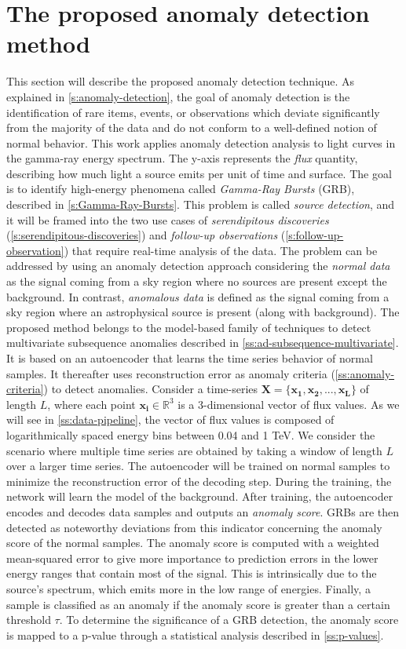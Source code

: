 \section{The proposed anomaly detection method}
\label{s:contribution}
This section will describe the proposed anomaly detection technique. As explained in \autoref{s:anomaly-detection}, the goal of anomaly detection is the identification of rare items, events, or observations which deviate significantly from the majority of the data and do not conform to a well-defined notion of normal behavior.
This work applies anomaly detection analysis to light curves in the gamma-ray energy spectrum. The y-axis represents the \textit{flux} quantity,  describing how much light a source emits per unit of time and surface. The goal is to identify high-energy phenomena called \textit{Gamma-Ray Bursts} (GRB), described in \autoref{s:Gamma-Ray-Bursts}. This problem is called \textit{source detection}, and it will be framed into the two  use cases of \textit{serendipitous discoveries} (\autoref{s:serendipitous-discoveries}) and \textit{follow-up observations} (\autoref{s:follow-up-observation}) that require real-time analysis of the data. The problem can be addressed by using an anomaly detection approach considering the \textit{normal data} as the signal coming from a sky region where no sources are present except the background. In contrast, \textit{anomalous data} is defined as the signal coming from a sky region where an astrophysical source is present (along with background).
The proposed method belongs to the model-based family of techniques to detect multivariate subsequence anomalies described in \autoref{ss:ad-subsequence-multivariate}. It is based on an autoencoder that learns the time series behavior of normal samples. It thereafter uses reconstruction error as anomaly criteria (\autoref{ss:anomaly-criteria}) to detect anomalies. 
Consider a time-series $\bm{X} = \{\bm{x_1}, \bm{x_2}, ..., \bm{x_L}\}$ of length $L$, where each point $\bm{x_i} \in \mathbb{R}^3$ is a 3-dimensional vector of flux values. As we will see in \autoref{ss:data-pipeline}, 
the vector of flux values is composed of logarithmically spaced energy bins between 0.04 and 1 TeV. We consider the scenario where multiple  time series are obtained by taking a window of length $L$ over a larger time series. The autoencoder will be trained on normal samples to minimize the reconstruction error of the decoding step. During the training, the network will learn the model of the background. After training, the autoencoder encodes and decodes data samples and outputs an \textit{anomaly score}. GRBs are then detected as noteworthy deviations from this indicator concerning the anomaly score of the normal samples. The anomaly score is computed with a weighted mean-squared error to give more importance to prediction errors in the lower energy ranges that contain most of the signal. This is intrinsically due to the source's spectrum, which emits more in the low range of energies. Finally, a sample is classified as an anomaly if the anomaly score is greater than a certain threshold $\tau$. To determine the significance of a GRB detection, the anomaly score is mapped to a p-value through a statistical analysis described in \autoref{ss:p-values}. 


